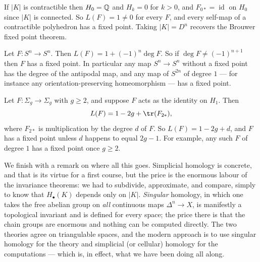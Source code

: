 \documentclass[a4paper]{scrartcl}
\newcommand{\id}{\operatorname{id}}
\begin{document}
\begin{example}
	If $|K|$ is contractible then $H_0 = \mathbb{Q}$ and $H_k = 0$ for $k > 0$, and $F_{0*} = \id$ on $H_0$ since $|K|$ is connected. So $L(F) = 1 \neq 0$ for every $F$, and every self-map of a contractible polyhedron has a fixed point. Taking $|K| = D^n$ recovers the Brouwer fixed point theorem.
\end{example}

\begin{example}
	Let $F: S^n \to S^n$. Then $L(F) = 1 + (-1)^n\deg F$. So if $\deg F \neq (-1)^{n+1}$ then $F$ has a fixed point. In particular any map $S^n \to S^n$ without a fixed point has the degree of the antipodal map, and any map of $S^{2n}$ of degree $1$ --- for instance any orientation-preserving homeomorphism --- has a fixed point.
\end{example}

\begin{example}
	Let $F: \Sigma_g \to \Sigma_g$ with $g \geq 2$, and suppose $F$ acts as the identity on $H_1$. Then
	$$
	L(F) = 1 - 2g + \tr(F_{2*}),
	$$
	where $F_{2*}$ is multiplication by the degree $d$ of $F$. So $L(F) = 1-2g+d$, and $F$ has a fixed point unless $d$ happens to equal $2g-1$. For example, any such $F$ of degree $1$ has a fixed point once $g \geq 2$.
\end{example}

We finish with a remark on where all this goes. Simplicial homology is concrete, and that
is its virtue for a first course, but the price is the enormous labour of the invariance
theorems: we had to subdivide, approximate, and compare, simply to know that
$H_\bullet(K)$ depends only on $|K|$. \emph{Singular} homology, in which one takes the
free abelian group on \emph{all} continuous maps $\Delta^n \to X$, is manifestly a
topological invariant and is defined for every space; the price there is that the chain
groups are enormous and nothing can be computed directly. The two theories agree on
triangulable spaces, and the modern approach is to use singular homology for the theory
and simplicial (or cellular) homology for the computations --- which is, in effect, what
we have been doing all along.
\end{document}
